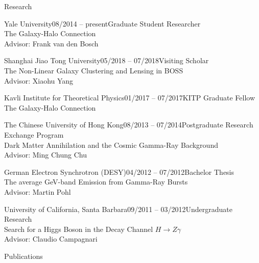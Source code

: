 \documentclass[11pt]{resume} %
\begin{document}
\begin{rSection}{Research}
  \begin{adjustwidth}{0.5cm}{}
    \begin{rSubsection}{Yale University}{08/2014 -- present}{Graduate Student Researcher\\The Galaxy-Halo Connection\\Advisor: Frank van den Bosch}{}\end{rSubsection}
    \begin{rSubsection}{Shanghai Jiao Tong University}{05/2018 -- 07/2018}{Visiting Scholar\\The Non-Linear Galaxy Clustering and Lensing in BOSS\\Advisor: Xiaohu Yang}{}\end{rSubsection}
    \begin{rSubsection}{Kavli Institute for Theoretical Physics}{01/2017 -- 07/2017}{KITP Graduate Fellow\\The Galaxy-Halo Connection}{}\end{rSubsection}
    \begin{rSubsection}{The Chinese University of Hong Kong}{08/2013 -- 07/2014}{Postgraduate Research Exchange Program\\Dark Matter Annihilation and the Cosmic Gamma-Ray Background\\Advisor: Ming Chung Chu}{}\end{rSubsection}
    \begin{rSubsection}{German Electron Synchrotron (DESY)}{04/2012 -- 07/2012}{Bachelor Thesis\\The average GeV-band Emission from Gamma-Ray Bursts\\Advisor: Martin Pohl}{}\end{rSubsection}
    \begin{rSubsection}{University of California, Santa Barbara}{09/2011 -- 03/2012}{Undergraduate Research\\Search for a Higgs Boson in the Decay Channel $H \rightarrow Z\gamma$\\Advisor: Claudio Campagnari}{}\end{rSubsection}
  \end{adjustwidth}
\end{rSection}

\begin{rSection}{Publications}
  \setlength{\leftskip}{0.5cm}
  \nocite{13, 12, 11, 10, 9, 8, 7, 6, 5, 4, 3, 2, 1}
  \printbibliography[heading=none]
\end{rSection}
\end{document}
